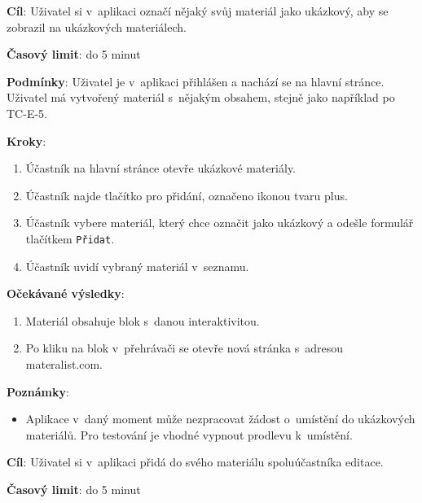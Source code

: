 \vspace{1em}

\textbf{Cíl}: Uživatel si v~aplikaci označí nějaký svůj materiál jako ukázkový, aby se zobrazil na ukázkových materiálech.

\textbf{Časový limit}: do 5 minut

\textbf{Podmínky}:  Uživatel je v~aplikaci přihlášen a nachází se na hlavní stránce.  Uživatel má vytvořený materiál s~nějakým obsahem, stejně jako například po TC-E-5.

\textbf{Kroky}:

\begin{enumerate}[leftmargin=1.4cm]
    \item Účastník na hlavní stránce otevře ukázkové materiály.
    \item Účastník najde tlačítko pro přidání, označeno ikonou tvaru plus.
    \item Účastník vybere materiál, který chce označit jako ukázkový a odešle formulář tlačítkem \verb|Přidat|.
    \item Účastník uvidí vybraný materiál v~seznamu.
\end{enumerate}

\textbf{Očekávané výsledky}:

\begin{enumerate}[leftmargin=1.4cm]
    \item Materiál obsahuje blok s~danou interaktivitou.
    \item Po kliku na blok v~přehrávači se otevře nová stránka s~adresou materalist.com.
\end{enumerate}

\textbf{Poznámky}:

\begin{itemize}[leftmargin=1.4cm]
    \item Aplikace v~daný moment může nezpracovat žádost o~umístění do ukázkových materiálů. Pro testování je vhodné vypnout prodlevu k~umístění.
\end{itemize}





\vspace{1em}

\textbf{Cíl}: Uživatel si v~aplikaci přidá do svého materiálu spoluúčastníka editace.

\textbf{Časový limit}: do 5 minut

